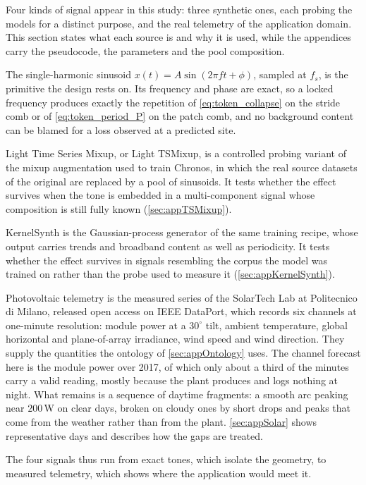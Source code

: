 Four kinds of signal appear in this study: three synthetic ones, each probing the models for a distinct purpose, and the real telemetry of the application domain. This section states what each source is and why it is used, while the appendices carry the pseudocode, the parameters and the pool composition.

The single-harmonic sinusoid $x(t)=A\sin(2\pi f t+\phi)$, sampled at $f_s$, is the primitive the design rests on. Its frequency and phase are exact, so a locked frequency produces exactly the repetition of \autoref{eq:token_collapse} on the stride comb or of \autoref{eq:token_period_P} on the patch comb, and no background content can be blamed for a loss observed at a predicted site.

Light Time Series Mixup, or Light TSMixup, is a controlled probing variant of the mixup augmentation used to train Chronos\autocite{ansariChronosLearningLanguage2024}, in which the real source datasets of the original are replaced by a pool of sinusoids. It tests whether the effect survives when the tone is embedded in a multi-component signal whose composition is still fully known (\autoref{sec:appTSMixup}).

KernelSynth is the Gaussian-process generator of the same training recipe\autocite{ansariChronosLearningLanguage2024}, whose output carries trends and broadband content as well as periodicity. It tests whether the effect survives in signals resembling the corpus the model was trained on rather than the probe used to measure it (\autoref{sec:appKernelSynth}).

Photovoltaic telemetry is the measured series of the SolarTech Lab at Politecnico di Milano, released open access on IEEE DataPort\autocite{levaPhotovoltaicPowerWeather2020}, which records six channels at one-minute resolution: module power at a $30^\circ$ tilt, ambient temperature, global horizontal and plane-of-array irradiance, wind speed and wind direction. They supply the quantities the ontology of \autoref{sec:appOntology} uses. The channel forecast here is the module power over 2017, of which only about a third of the minutes carry a valid reading, mostly because the plant produces and logs nothing at night. What remains is a sequence of daytime fragments: a smooth arc peaking near $200$\,W on clear days, broken on cloudy ones by short drops and peaks that come from the weather rather than from the plant\@. \autoref{sec:appSolar} shows representative days and describes how the gaps are treated.

The four signals thus run from exact tones, which isolate the geometry, to measured telemetry, which shows where the application would meet it.
